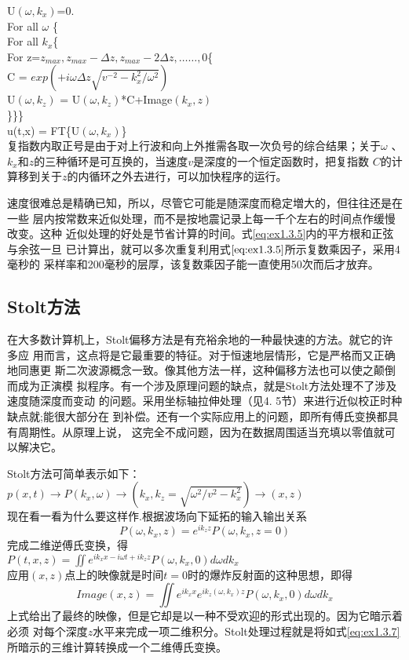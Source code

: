 	U$(\omega,k_x)$=0.\\
For all $\omega$ \{\\
For all $k_x$\{\\
For z=$z_{max}, z_{max}-\Delta z, z_{max}-2\Delta z, \ldots\ldots, 0$\{\\
	C = $exp(+i\omega\Delta z\sqrt{v^{-2}-k_x^2/\omega^2})$\\
	U$(\omega,k_z)$ = U$(\omega,k_z)$*C+Image$(k_x,z)$\\
	\}\}\}\\
u(t,x) = FT\{U$(\omega,k_x)$\} \\
复指数内取正号是由于对上行波和向上外推需各取一次负号的综合结果；关于$\omega$
、$k_x$和$z$的三种循环是可互换的，当速度$v$是深度的一个恒定函数时，把复指数
$C$的计算移到关于$z$的内循环之外去进行，可以加快程序的运行。

速度很难总是精确已知，所以，尽管它可能是随深度而稳定増大的，但往往还是在一些
层内按常数来近似处理，而不是按地震记录上每一千个左右的时间点作缓慢改变。这种
近似处理的好处是节省计算的时间。式\ref{eq:ex1.3.5}内的平方根和正弦与余弦一旦
已计算出，就可以多次重复利用式$\ref{eq:ex1.3.5}$所示复数乘因子，采用4毫秒的
采样率和200毫秒的层厚，该复数乘因子能一直使用50次而后才放弃。

\subsection{Stolt方法}
在大多数计算机上，Stolt偏移方法是有充裕余地的一种最快速的方法。就它的许多应
用而言，这点将是它最重要的特征。对于恒速地层情形，它是严格而又正确地同惠更
斯二次波源概念一致。像其他方法一样，这种偏移方法也可以使之颠倒而成为正演模
拟程序。有一个涉及原理问题的缺点，就是Stolt方法处理不了涉及速度随深度而变动
的问题。采用坐标轴拉伸处理（见4. 5节）来进行近似校正时种缺点就;能很大部分在
到补偿。还有一个实际应用上的问题，即所有傅氏变换都具有周期性。从原理上说，
这完全不成问题，因为在数据周围适当充填以零值就可以解决它。

Stolt方法可简单表示如下：\\
$p(x,t)\rightarrow P(k_x,\omega)\rightarrow(k_x,k_z=\sqrt{\omega^2/v^2-k_x^2})\rightarrow(x,z)$\\
现在看一看为什么要这样作.根据波场向下延拓的输入输出关系
\begin{equation}
P(\omega,k_x,z)=e^{ik_zz}P(\omega,k_x,z=0)
\label{eq:ex1.3.6}
\end{equation}
完成二维逆傅氏变换，得 \\
$P(t,x,z)=\iint e^{ik_xx-i\omega t+ik_zz}P(\omega,k_x,0)d\omega dk_x$\\
应用$(x,z)$点上的映像就是时间$t=0$时的爆炸反射面的这种思想，即得
\begin{equation}
Image(x,z)=\iint e^{ik_xx}e^{ik_z(\omega,k_x)z}P(\omega,k_x,0)d\omega dk_x
\label{eq:ex1.3.7}
\end{equation}
上式给出了最终的映像，但是它却是以一种不受欢迎的形式出现的。因为它暗示着必须
对每个深度$z$水平来完成一项二维积分。Stolt处理过程就是将如式\ref{eq:ex1.3.7}
所暗示的三维计算转换成一个二维傅氏变换。

